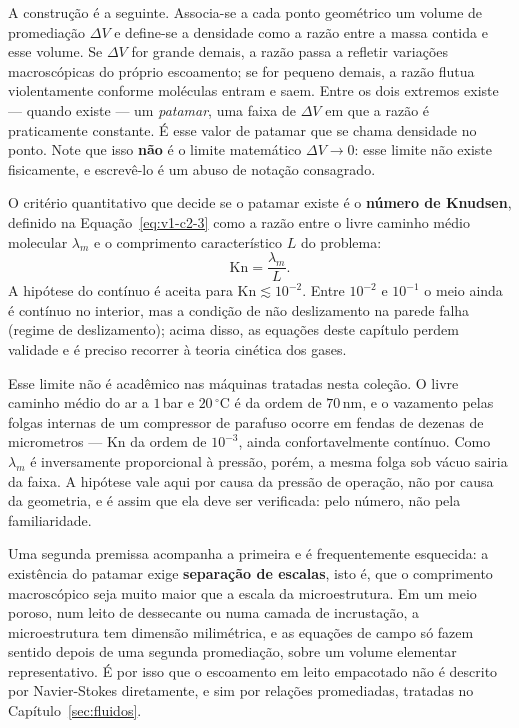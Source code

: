 \documentclass[12pt,a4paper]{article}
\numberwithin{equation}{section}
\numberwithin{table}{section}
\numberwithin{figure}{section}
\begin{document}
A construção é a seguinte. Associa-se a cada ponto geométrico um volume de
promediação $\Delta V$ e define-se a densidade como a razão entre a massa
contida e esse volume. Se $\Delta V$ for grande demais, a razão passa a
refletir variações macroscópicas do próprio escoamento; se for pequeno demais,
a razão flutua violentamente conforme moléculas entram e saem. Entre os dois
extremos existe --- quando existe --- um \emph{patamar}, uma faixa de $\Delta
V$ em que a razão é praticamente constante. É esse valor de patamar que se
chama densidade no ponto. Note que isso \textbf{não} é o limite matemático
$\Delta V \to 0$: esse limite não existe fisicamente, e escrevê-lo é um abuso
de notação consagrado.

O critério quantitativo que decide se o patamar existe é o \textbf{número de
Knudsen}, definido na Equação~\eqref{eq:v1-c2-3} como a razão entre o livre
caminho médio molecular $\lambda_m$ e o comprimento característico $L$ do
problema:
\begin{equation}\label{eq:v1-c2-3}
\mathrm{Kn} = \frac{\lambda_m}{L}.
\end{equation}
A hipótese do contínuo é aceita para $\mathrm{Kn} \lesssim 10^{-2}$. Entre
$10^{-2}$ e $10^{-1}$ o meio ainda é contínuo no interior, mas a condição de
não deslizamento na parede falha (regime de deslizamento); acima disso, as
equações deste capítulo perdem validade e é preciso recorrer à teoria cinética
dos gases.

Esse limite não é acadêmico nas máquinas tratadas nesta coleção. O livre
caminho médio do ar a $1\,$bar e $20\,^{\circ}$C é da ordem de $70\,$nm, e o
vazamento pelas folgas internas de um compressor de parafuso ocorre em fendas
de dezenas de micrometros --- $\mathrm{Kn}$ da ordem de $10^{-3}$, ainda
confortavelmente contínuo. Como $\lambda_m$ é inversamente proporcional à
pressão, porém, a mesma folga sob vácuo sairia da faixa. A hipótese vale aqui
por causa da pressão de operação, não por causa da geometria, e é assim que ela
deve ser verificada: pelo número, não pela familiaridade.

Uma segunda premissa acompanha a primeira e é frequentemente esquecida: a
existência do patamar exige \textbf{separação de escalas}, isto é, que o
comprimento macroscópico seja muito maior que a escala da microestrutura. Em um
meio poroso, num leito de dessecante ou numa camada de incrustação, a
microestrutura tem dimensão milimétrica, e as equações de campo só fazem
sentido depois de uma segunda promediação, sobre um volume elementar
representativo. É por isso que o escoamento em leito empacotado não é descrito
por Navier-Stokes diretamente, e sim por relações promediadas, tratadas no
Capítulo~\ref{sec:fluidos}.
\end{document}
